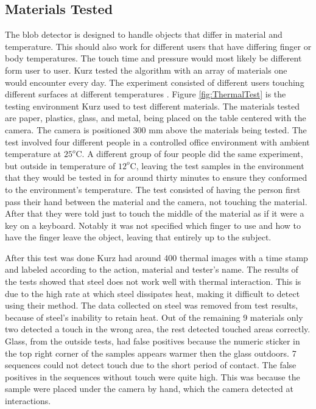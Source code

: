 \documentclass{sig-alternate}
\begin{document}
\subsection{Materials Tested}
\label{Materials Tested}
The blob detector is designed to handle objects that differ in material and temperature. This should also work for different users that have differing finger or body temperatures. The touch time and pressure would most likely be different form user to user. Kurz tested the algorithm with an array of materials one would encounter every day. The experiment consisted of different users touching different surfaces at different temperatures \cite{3D}. Figure \ref{fig:ThermalTest} is the testing environment Kurz used to test different materials. The materials tested are paper, plastics, glass, and metal, being placed on the table centered with the camera. The camera is positioned 300 mm above the materials being tested. The test involved four different people in a controlled office environment with ambient temperature at \(25^o\)C. A different group of four people did the same experiment, but outside in temperature of \(12^o\)C, leaving the test samples in the environment that they would be tested in for around thirty minutes to ensure they conformed to the environment's temperature. The test consisted of having the person first pass their hand between the material and the camera, not touching the material. After that they were told just to touch the middle of the material as if it were a key on a keyboard. Notably it was not specified which finger to use and how to have the finger leave the object, leaving that entirely up to the subject. 

After this test was done Kurz had around 400 thermal images with a time stamp and labeled according to the action, material and tester's name. The results of the tests showed that  steel does not work well with thermal interaction. This is due to the high rate at which steel dissipates heat, making it difficult to detect using their method. The data collected on steel was removed from test results, because of steel's inability to retain heat. Out of the remaining 9 materials only two detected a touch in the wrong area, the rest detected touched areas correctly. Glass, from the outside tests, had false positives because the numeric sticker in the top right corner of the samples appears warmer then the glass outdoors. 7 sequences could not detect touch due to the short period of contact. The false positives in the sequences without touch were quite high. This was because the sample were placed under the camera by hand, which the camera detected at interactions. 
\end{document}
